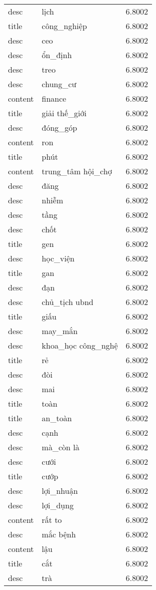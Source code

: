 \documentclass{article}
\begin{document}
\begin{tabular}{lll}
desc & lịch & 6.8002\\
title & công\_nghiệp & 6.8002\\
desc & ceo & 6.8002\\
desc & ổn\_định & 6.8002\\
desc & treo & 6.8002\\
desc & chung\_cư & 6.8002\\
content & finance & 6.8002\\
title & giải thế\_giới & 6.8002\\
desc & đóng\_góp & 6.8002\\
content & ron & 6.8002\\
title & phút & 6.8002\\
content & trung\_tâm hội\_chợ & 6.8002\\
desc & đăng & 6.8002\\
desc & nhiễm & 6.8002\\
desc & tầng & 6.8002\\
desc & chốt & 6.8002\\
title & gen & 6.8002\\
desc & học\_viện & 6.8002\\
title & gan & 6.8002\\
desc & đạn & 6.8002\\
desc & chủ\_tịch ubnd & 6.8002\\
title & giấu & 6.8002\\
desc & may\_mắn & 6.8002\\
desc & khoa\_học công\_nghệ & 6.8002\\
title & rẻ & 6.8002\\
desc & đòi & 6.8002\\
desc & mai & 6.8002\\
title & toàn & 6.8002\\
title & an\_toàn & 6.8002\\
desc & cạnh & 6.8002\\
desc & mà\_còn là & 6.8002\\
desc & cưới & 6.8002\\
title & cướp & 6.8002\\
desc & lợi\_nhuận & 6.8002\\
desc & lợi\_dụng & 6.8002\\
content & rất to & 6.8002\\
desc & mắc bệnh & 6.8002\\
content & lậu & 6.8002\\
title & cắt & 6.8002\\
desc & trà & 6.8002\\

\end{tabular}
\end{document}

